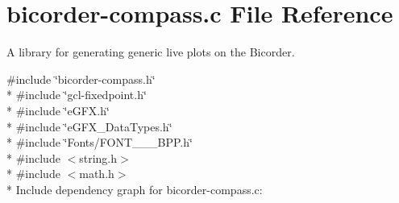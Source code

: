 \hypertarget{bicorder-compass_8c}{}\section{bicorder-\/compass.c File Reference}
\label{bicorder-compass_8c}


A library for generating generic live plots on the Bicorder.  


{\ttfamily \#include \char`\"{}bicorder-\/compass.\+h\char`\"{}}\\*
{\ttfamily \#include \char`\"{}gcl-\/fixedpoint.\+h\char`\"{}}\\*
{\ttfamily \#include \char`\"{}e\+G\+F\+X.\+h\char`\"{}}\\*
{\ttfamily \#include \char`\"{}e\+G\+F\+X\+\_\+\+Data\+Types.\+h\char`\"{}}\\*
{\ttfamily \#include \char`\"{}Fonts/\+F\+O\+N\+T\+\_\+\_\+\_\+B\+P\+P.\+h\char`\"{}}\\*
{\ttfamily \#include $<$string.\+h$>$}\\*
{\ttfamily \#include $<$math.\+h$>$}\\*
Include dependency graph for bicorder-\/compass.c\+:
